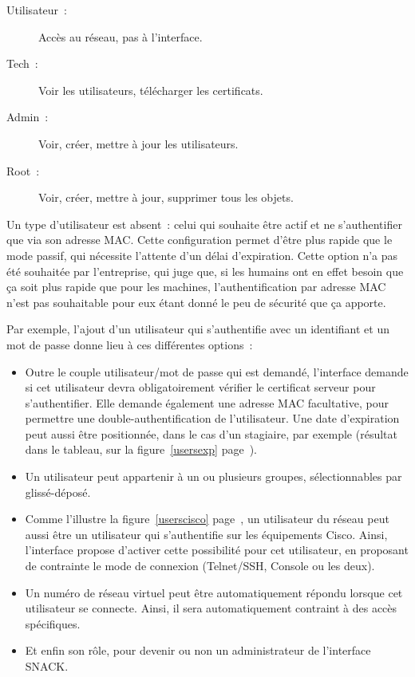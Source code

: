 \begin{description}
\item[Utilisateur~:] Accès au réseau, pas à l'interface.
\item[Tech~:] Voir les utilisateurs, télécharger les certificats.
\item[Admin~:] Voir, créer, mettre à jour les utilisateurs.
\item[Root~:] Voir, créer, mettre à jour, supprimer tous les objets.
\end{description}

Un type d'utilisateur est absent~: celui qui souhaite être actif et ne s'authentifier que via son adresse MAC. Cette configuration permet d'être plus rapide que le mode passif, qui nécessite l'attente d'un délai d'expiration. Cette option n'a pas été souhaitée par l'entreprise, qui juge que, si les humains ont en effet besoin que ça soit plus rapide que pour les machines, l'authentification par adresse MAC n'est pas souhaitable pour eux étant donné le peu de sécurité que ça apporte.

Par exemple, l'ajout d'un utilisateur qui s'authentifie avec un identifiant et un mot de passe donne lieu à ces différentes options~:

\begin{itemize}
\item Outre le couple utilisateur/mot de passe qui est demandé, l'interface demande si cet utilisateur devra obligatoirement vérifier le certificat serveur pour s'authentifier. Elle demande également une adresse MAC facultative, pour permettre une double-authentification de l'utilisateur. Une date d'expiration peut aussi être positionnée, dans le cas d'un stagiaire, par exemple (résultat dans le tableau, sur la figure~\ref{usersexp} page~\pageref{usersexp}).
\item Un utilisateur peut appartenir à un ou plusieurs groupes, sélectionnables par glissé-déposé.
\item Comme l'illustre la figure~\ref{userscisco} page~\pageref{userscisco}, un utilisateur du réseau peut aussi être un utilisateur qui s'authentifie sur les équipements Cisco. Ainsi, l'interface propose d'activer cette possibilité pour cet utilisateur, en proposant de contrainte le mode de connexion (Telnet/SSH, Console ou les deux).
\item Un numéro de réseau virtuel peut être automatiquement répondu lorsque cet utilisateur se connecte. Ainsi, il sera automatiquement contraint à des accès spécifiques.
\item Et enfin son rôle, pour devenir ou non un administrateur de l'interface SNACK.
\end{itemize}

